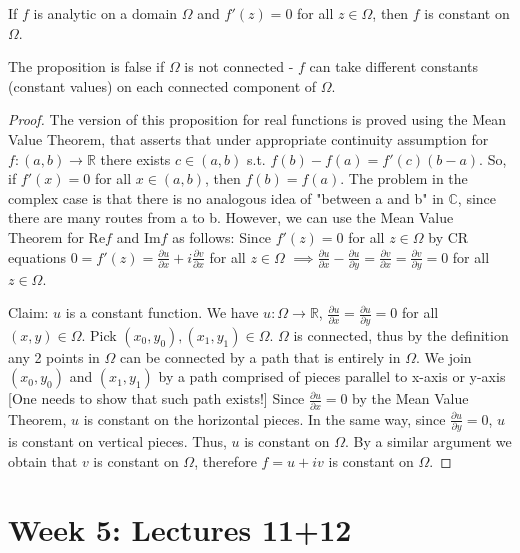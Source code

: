 \documentclass[12pt]{article}
\newcommand{\Rea}{\text{Re}}
\newcommand{\Ima}{\text{Im}}
\begin{document}
\begin{proposition}
If $f$ is analytic on a domain $\Omega$ and $f'(z) = 0$ for all $z \in \Omega$, then $f$ is constant on $\Omega$.
\end{proposition}

\begin{remark}
The proposition is false if $\Omega$ is not connected - $f$ can take different constants (constant values) on each connected component of $\Omega$.
\end{remark}

\begin{proof}
The version of this proposition for real functions is proved using the Mean Value Theorem, that asserts that under appropriate continuity assumption for $f:(a,b) \to \mathbb{R}$ there exists $c \in (a,b)$ s.t. $f(b) - f(a) = f'(c)(b-a)$. So, if $f'(x) = 0$ for all $x \in (a,b)$, then $f(b) = f(a)$. The problem in the complex case is that there is no analogous idea of "between a and b" in $\mathbb{C}$, since there are many routes from a to b.
However, we can use the Mean Value Theorem for $\Rea f$ and $\Ima f$ as follows:
Since $f'(z) = 0$ for all $z \in \Omega$ by CR equations $0 = f'(z) = \frac{\partial u}{\partial x} + i\frac{\partial v}{\partial x}$ for all $z \in \Omega$
$\implies \frac{\partial u}{\partial x} - \frac{\partial u}{\partial y} = \frac{\partial v}{\partial x} = \frac{\partial v}{\partial y} = 0$ for all $z \in \Omega$.

Claim: $u$ is a constant function.
We have $u: \Omega \to \mathbb{R}$, $\frac{\partial u}{\partial x} = \frac{\partial u}{\partial y} = 0$ for all $(x,y) \in \Omega$.
Pick $(x_0, y_0), (x_1, y_1) \in \Omega$. $\Omega$ is connected, thus by the definition any 2 points in $\Omega$ can be connected by a path that is entirely in $\Omega$. We join $(x_0, y_0)$ and $(x_1, y_1)$ by a path comprised of pieces parallel to x-axis or y-axis [One needs to show that such path exists!] Since $\frac{\partial u}{\partial x} = 0$ by the Mean Value Theorem, $u$ is constant on the horizontal pieces. In the same way, since $\frac{\partial u}{\partial y} = 0$, $u$ is constant on vertical pieces. Thus, $u$ is constant on $\Omega$.
By a similar argument we obtain that $v$ is constant on $\Omega$, therefore $f = u+iv$ is constant on $\Omega$.
\end{proof}

\section{Week 5: Lectures 11+12}
\end{document}
